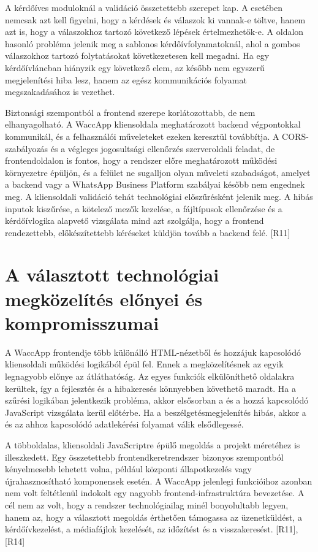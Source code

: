 A kérdőíves moduloknál a validáció összetettebb szerepet kap. A  esetében nemcsak azt kell figyelni, hogy a kérdések és válaszok ki vannak-e töltve, hanem azt is, hogy a válaszokhoz tartozó következő lépések értelmezhetők-e. A  oldalon hasonló probléma jelenik meg a sablonos kérdőívfolyamatoknál, ahol a gombos válaszokhoz tartozó folytatásokat következetesen kell megadni. Ha egy kérdőívláncban hiányzik egy következő elem, az később nem egyszerű megjelenítési hiba lesz, hanem az egész kommunikációs folyamat megszakadásához is vezethet.

Biztonsági szempontból a frontend szerepe korlátozottabb, de nem elhanyagolható. A WaccApp kliensoldala meghatározott backend végpontokkal kommunikál, és a felhasználói műveleteket ezeken keresztül továbbítja. A CORS-szabályozás és a végleges jogosultsági ellenőrzés szerveroldali feladat, de frontendoldalon is fontos, hogy a rendszer előre meghatározott működési környezetre épüljön, és a felület ne sugalljon olyan műveleti szabadságot, amelyet a backend vagy a WhatsApp Business Platform szabályai később nem engednek meg. A kliensoldali validáció tehát technológiai előszűrésként jelenik meg. A hibás inputok kiszűrése, a kötelező mezők kezelése, a fájltípusok ellenőrzése és a kérdőívlogika alapvető vizsgálata mind azt szolgálja, hogy a frontend rendezettebb, előkészítettebb kéréseket küldjön tovább a backend felé. [R11]

\section{A választott technológiai megközelítés előnyei és kompromisszumai}

A WaccApp frontendje több különálló HTML-nézetből és hozzájuk kapcsolódó kliensoldali működési logikából épül fel. Ennek a megközelítésnek az egyik legnagyobb előnye az átláthatóság. Az egyes funkciók elkülöníthető oldalakra kerültek, így a fejlesztés és a hibakeresés könnyebben követhető maradt. Ha a szűrési logikában jelentkezik probléma, akkor elsősorban a  és a hozzá kapcsolódó JavaScript vizsgálata kerül előtérbe. Ha a beszélgetésmegjelenítés hibás, akkor a  és az ahhoz kapcsolódó adatlekérési folyamat válik elsődlegessé.

A többoldalas, kliensoldali JavaScriptre épülő megoldás a projekt méretéhez is illeszkedett. Egy összetettebb frontendkeretrendszer bizonyos szempontból kényelmesebb lehetett volna, például központi állapotkezelés vagy újrahasznosítható komponensek esetén. A WaccApp jelenlegi funkcióihoz azonban nem volt feltétlenül indokolt egy nagyobb frontend-infrastruktúra bevezetése. A cél nem az volt, hogy a rendszer technológiailag minél bonyolultabb legyen, hanem az, hogy a választott megoldás érthetően támogassa az üzenetküldést, a kérdőívkezelést, a médiafájlok kezelését, az időzítést és a visszakeresést. [R11], [R14]

